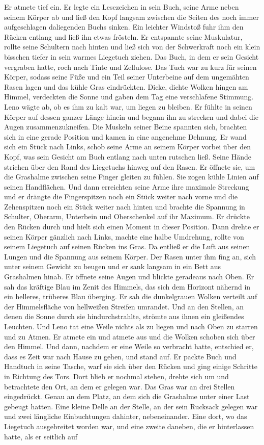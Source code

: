 \documentclass[ngerman,smalldemyvopaper,11pt,oneside,onecolumn,openright,extrafontsizes]{memoir}
\begin{document}
Er atmete tief ein. Er legte ein Lesezeichen in sein Buch, seine Arme neben seinem Körper ab und ließ den Kopf langsam zwischen die Seiten des noch immer aufgeschlagen daliegenden Buchs sinken. Ein leichter Windstoß fuhr ihm den Rücken entlang und ließ ihn etwas frösteln. Er entspannte seine Muskulatur, rollte seine Schultern nach hinten und ließ sich von der Schwerkraft noch ein klein bisschen tiefer in sein warmes Liegetuch ziehen. Das Buch, in dem er sein Gesicht vergraben hatte, roch nach Tinte und Zellulose. Das Tuch war zu kurz für seinen Körper, sodass seine Füße und ein Teil seiner Unterbeine auf dem ungemähten Rasen lagen und das kühle Gras eindrückten. Dicke, dichte Wolken hingen am Himmel, verdeckten die Sonne und gaben dem Tag eine verschlafene Stimmung. Leno wägte ab, ob es ihm zu kalt war, um liegen zu bleiben. Er fühlte in seinen Körper auf dessen ganzer Länge hinein und begann ihn zu strecken und dabei die Augen zusammenzukneifen. Die Muskeln seiner Beine spannten sich, brachten sich in eine gerade Position und kamen in eine angenehme Dehnung. Er wand sich ein Stück nach Links, schob seine Arme an seinem Körper vorbei über den Kopf, was sein Gesicht am Buch entlang nach unten rutschen ließ. Seine Hände strichen über den Rand des Liegetuchs hinweg auf den Rasen. Er öffnete sie, um die Grashalme zwischen seine Finger gleiten zu fühlen. Sie zogen kühle Linien auf seinen Handflächen. Und dann erreichten seine Arme ihre maximale Streckung und er drängte die Fingerspitzen noch ein Stück weiter nach vorne und die Zehenspitzen noch ein Stück weiter nach hinten und brachte die Spannung in Schulter, Oberarm, Unterbein und Oberschenkel auf ihr Maximum. Er drückte den Rücken durch und hielt sich einen Moment in dieser Position. Dann drehte er seinen Körper gänzlich nach Links, machte eine halbe Umdrehung, rollte von seinem Liegetuch auf seinen Rücken ins Gras. Da entließ er die Luft aus seinen Lungen und die Spannung aus seinem Körper. Der Rasen unter ihm fing an, sich unter seinem Gewicht zu beugen und er sank langsam in ein Bett aus Grashalmen hinab. Er öffnete seine Augen und blickte geradeaus nach Oben. Er sah das kräftige Blau im Zenit des Himmels, das sich dem Horizont nähernd in ein helleres, trüberes Blau überging. Er sah die dunkelgrauen Wolken verteilt auf der Himmelsfläche von hellweißen Streifen umrandet. Und an den Stellen, an denen die Sonne durch sie hindurchstrahlte, strömte aus ihnen ein gleißendes Leuchten. Und Leno tat eine Weile nichts als zu liegen und nach Oben zu starren und zu Atmen. Er atmete ein und atmete aus und die Wolken schoben sich über den Himmel. Und dann, nachdem er eine Weile so verbracht hatte, entschied er, dass es Zeit war nach Hause zu gehen, und stand auf. Er packte Buch und Handtuch in seine Tasche, warf sie sich über den Rücken und ging einige Schritte in Richtung des Tors. Dort blieb er nochmal stehen, drehte sich um und betrachtete den Ort, an dem er gelegen war. Das Gras war an drei Stellen eingedrückt. Genau an dem Platz, an dem sich die Grashalme unter einer Last gebeugt hatten. Eine kleine Delle an der Stelle, an der sein Rucksack gelegen war und zwei längliche Einbuchtungen dahinter, nebeneinander. Eine dort, wo das Liegetuch ausgebreitet worden war, und eine zweite daneben, die er hinterlassen hatte, als er seitlich auf 
\end{document}
